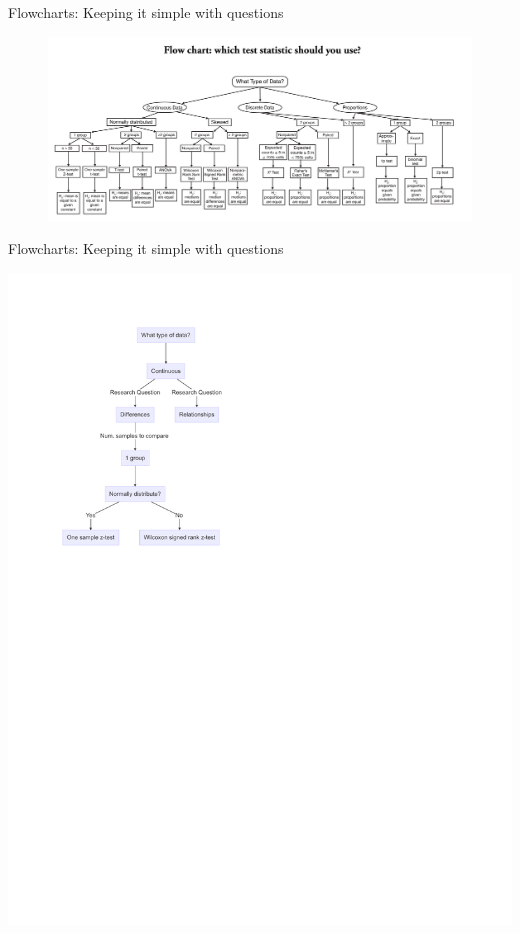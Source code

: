 \documentclass[
  ignorenonframetext,
]{beamer}
\begin{document}
\begin{frame}{Flowcharts: Keeping it simple with questions}
\label{flowcharts-keeping-it-simple-with-questions-1}
\begin{figure}

{\centering \includegraphics[width=1\linewidth]{fig/which_test_flowchart} 

}

\end{figure}
\end{frame}

\begin{frame}{Flowcharts: Keeping it simple with questions}
\label{flowcharts-keeping-it-simple-with-questions-2}
\begin{center}\includegraphics{Inferential-Stat-and-Z-test_files/figure-beamer/figure_1-1} \end{center}
\end{frame}
\end{document}
